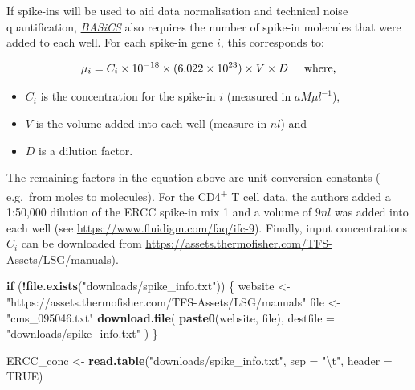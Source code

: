 \documentclass[9pt,a4paper,]{extarticle}
\newenvironment{Shaded}{\begin{snugshade}}{\end{snugshade}}
\newcommand{\CharTok}[1]{\textcolor[rgb]{0.31,0.60,0.02}{#1}}
\newcommand{\ControlFlowTok}[1]{\textcolor[rgb]{0.13,0.29,0.53}{\textbf{#1}}}
\newcommand{\DataTypeTok}[1]{\textcolor[rgb]{0.13,0.29,0.53}{#1}}
\newcommand{\KeywordTok}[1]{\textcolor[rgb]{0.13,0.29,0.53}{\textbf{#1}}}
\newcommand{\NormalTok}[1]{#1}
\newcommand{\OperatorTok}[1]{\textcolor[rgb]{0.81,0.36,0.00}{\textbf{#1}}}
\newcommand{\OtherTok}[1]{\textcolor[rgb]{0.56,0.35,0.01}{#1}}
\newcommand{\StringTok}[1]{\textcolor[rgb]{0.31,0.60,0.02}{#1}}
\begin{document}
If spike-ins will be used to aid data normalisation and technical noise
quantification, \emph{\href{https://bioconductor.org/packages/3.11/BASiCS}{BASiCS}} also requires the number of spike-in
molecules that were added to each well.
For each spike-in gene \(i\), this corresponds to:

\[ \mu_{i} = C_i \times 10^{-18} \times (6.022 \times 10^{23}) 
\times V \times D \hspace{0.5cm} \mbox{where,} \]

\begin{itemize}
\item
  \(C_i\) is the concentration for the spike-in \(i\) (measured in \(aM\mu{}l^{-1}\)),
\item
  \(V\) is the volume added into each well (measure in \(nl\)) and
\item
  \(D\) is a dilution factor.
\end{itemize}

The remaining factors in the equation above are unit conversion constants (
e.g.~from moles to molecules).
For the CD4\textsuperscript{+} T cell data, the authors added a 1:50,000 dilution of the ERCC
spike-in mix 1 and a volume of \(9nl\) was added into each well (see \url{https://www.fluidigm.com/faq/ifc-9}).
Finally, input concentrations \(C_i\) can be downloaded from \href{https://assets.thermofisher.com/TFS-Assets/LSG/manuals/cms_095046.txt}{https://assets.thermofisher.com/TFS-Assets/LSG/manuals}).

\begin{Shaded}
\begin{Highlighting}[]
\ControlFlowTok{if}\NormalTok{ (}\OperatorTok{!}\KeywordTok{file.exists}\NormalTok{(}\StringTok{"downloads/spike_info.txt"}\NormalTok{)) \{}
\NormalTok{  website <-}\StringTok{ "https://assets.thermofisher.com/TFS-Assets/LSG/manuals"}
\NormalTok{  file <-}\StringTok{ "cms_095046.txt"}
  \KeywordTok{download.file}\NormalTok{(}
    \KeywordTok{paste0}\NormalTok{(website, file),}
    \DataTypeTok{destfile =} \StringTok{"downloads/spike_info.txt"}
\NormalTok{  )  }
\NormalTok{\}}

\NormalTok{ERCC_conc <-}\StringTok{ }\KeywordTok{read.table}\NormalTok{(}\StringTok{"downloads/spike_info.txt"}\NormalTok{, }\DataTypeTok{sep =} \StringTok{"}\CharTok{\textbackslash{}t}\StringTok{"}\NormalTok{, }\DataTypeTok{header =} \OtherTok{TRUE}\NormalTok{)}
\end{Highlighting}
\end{Shaded}
\end{document}

